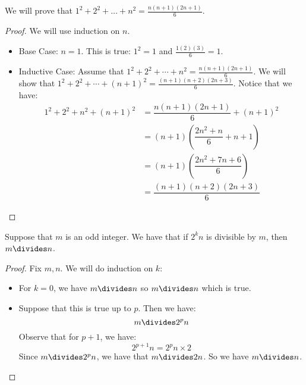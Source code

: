 \documentclass{report}
\begin{document}
\begin{examples}
    \begin{example}
        We will prove that $1^{2} + 2^{2} + \ldots + n^{2} = \frac{n(n + 1)(2n + 1)}{6}$.
            \begin{proof}
                We will use induction on $n$.
                    \begin{itemize}
                        \item Base Case: $n = 1$. This is true: $1^{2} = 1$ and $\frac{1(2)(3)}{6} = 1$.

                        \item Inductive Case: Assume that $1^{2} + 2^{2} + \cdots + n^{2} = \frac{n(n + 1)(2n + 1)}{6}$. We will show that $1^{2} + 2^{2} + \cdots + (n + 1)^{2} = \frac{(n + 1)(n + 2)(2n + 3)}{6}$. Notice that we have:
                            \begin{align*}
                                1^{2} + 2^{2} + n^{2} + (n + 1)^{2} &= \dfrac{n(n + 1)(2n + 1)}{6} + (n + 1)^{2}         \\
                                                                    &= (n + 1)\left(\dfrac{2n^{2} + n}{6} + n + 1\right) \\
                                                                    &= (n + 1)\left(\dfrac{2n^{2} + 7n + 6}{6}\right)    \\
                                                                    &= \dfrac{(n + 1)(n + 2)(2n + 3)}{6}   
                            \end{align*}
                    \end{itemize}
            \end{proof}
    \end{example}
    \begin{example}
        Suppose that $m$ is an odd integer. We have that if $2^{k}n$ is divisible by $m$, then $m \divides n$.
            \begin{proof}
                Fix $m, n$. We will do induction on $k$:
                    \begin{itemize}
                        \item For $k = 0$, we have $m \divides n$ so $m \divides n$ which is true.

                        \item Suppose that this is true up to $p$. Then we have:
                            \begin{equation*}
                                m \divides 2^{p}n
                            \end{equation*}
                        Observe that for $p + 1$, we have:
                            \begin{equation*}
                                2^{p + 1}n = 2^{p}n \times 2
                            \end{equation*}
                        Since $m \divides 2^{p}n$, we have that $m \divides 2n$. So we have $m \divides n$.


\end{itemize}
\end{proof}
\end{example}
\end{examples}
\end{document}
